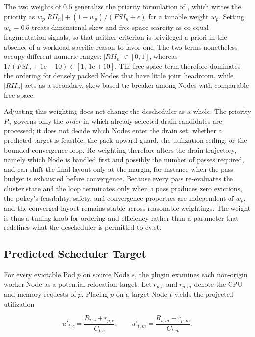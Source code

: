 The two weights of \(0.5\) generalize the priority formulation of \citet{guo2025joint}, which writes the priority as \(w_p\left|RII_n\right| + (1-w_p)\,/(FSI_n+\epsilon)\) for a tunable weight \(w_p\). Setting \(w_p = 0.5\) treats dimensional skew and free-space scarcity as co-equal fragmentation signals, so that neither criterion is privileged a priori in the absence of a workload-specific reason to favor one. The two terms nonetheless occupy different numeric ranges: \(\left|RII_n\right| \in [0,1]\), whereas \(1/(FSI_n+1\mathrm{e}{-}10) \in [1,\,1\mathrm{e}{+}10]\). The free-space term therefore dominates the ordering for densely packed Nodes that have little joint headroom, while \(\left|RII_n\right|\) acts as a secondary, skew-based tie-breaker among Nodes with comparable free space.

Adjusting this weighting does not change the descheduler as a whole. The priority \(P_n\) governs only the \emph{order} in which already-selected drain candidates are processed; it does not decide which Nodes enter the drain set, whether a predicted target is feasible, the pack-upward guard, the utilization ceiling, or the bounded convergence loop. Re-weighting therefore alters the drain trajectory, namely which Node is handled first and possibly the number of passes required, and can shift the final layout only at the margin, for instance when the pass budget is exhausted before convergence. Because every pass re-evaluates the cluster state and the loop terminates only when a pass produces zero evictions, the policy's feasibility, safety, and convergence properties are independent of \(w_p\), and the converged layout remains stable across reasonable weightings. The weight is thus a tuning knob for ordering and efficiency rather than a parameter that redefines what the descheduler is permitted to evict.

\subsection{Predicted Scheduler Target}
\label{sec:defrag_target_prediction}

For every evictable Pod \(p\) on source Node \(s\), the plugin examines each non-origin worker Node as a potential relocation target. Let \(r_{p,c}\) and \(r_{p,m}\) denote the CPU and memory requests of \(p\). Placing \(p\) on a target Node \(t\) yields the projected utilization

\[
    u'_{t,c} = \frac{R_{t,c} + r_{p,c}}{C_{t,c}},
    \qquad
    u'_{t,m} = \frac{R_{t,m} + r_{p,m}}{C_{t,m}}.
\]

